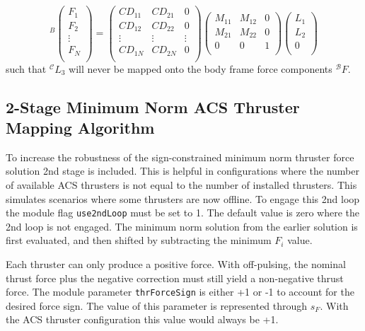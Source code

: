 \begin{equation}
{}^{B}\begin{pmatrix}
 F_1 \\
 F_2 \\
 \vdots \\
 F_N \\
\end{pmatrix} =
\begin{pmatrix}
CD_{11} & CD_{21} & 0 \\
CD_{12} & CD_{22} & 0 \\
\vdots  & \vdots  & \vdots \\
CD_{1N} & CD_{2N} & 0\\
\end{pmatrix}
\begin{pmatrix}
M_{11} & M_{12} & 0 \\
M_{21} & M_{22} & 0 \\
0 & 0 & 1 \\
\end{pmatrix}
\begin{pmatrix}
 L_1 \\
 L_2 \\
 0 \\
\end{pmatrix}
\end{equation}
such that ${}^{\mathcal{C}}L_3$ will never be mapped onto the body frame force components ${}^{\mathcal{B}}F$.


\subsection{2-Stage Minimum Norm ACS Thruster Mapping Algorithm}
To increase the robustness of the sign-constrained minimum norm thruster force solution  2nd stage is included.  This is helpful in configurations where the number of available ACS thrusters is not equal to the number of installed thrusters.  This simulates scenarios where some thrusters are now offline.  To engage this 2nd loop the module flag {\tt use2ndLoop} must be set to 1.  The default value is zero where the 2nd loop is not engaged.     The minimum norm solution from the earlier solution is first evaluated, and then shifted by subtracting the minimum $F_{i}$ value.

Each thruster can only produce a positive force.  With off-pulsing, the nominal thrust force plus the negative correction must still yield a non-negative thrust force.  The module parameter {\tt thrForceSign} is either +1 or -1 to account for the desired force sign.  The value of this parameter is represented through $s_{F}$.  With the ACS thruster configuration this value would always be +1.

